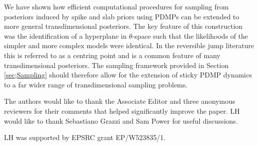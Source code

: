 \documentclass[ba,preprint]{imsart}
\theoremstyle{plain}
\theoremstyle{definition}
\theoremstyle{remark}
\begin{document}
We have shown how efficient computational procedures for sampling from posteriors induced by spike and slab priors using PDMPs can be extended to more general transdimensional posteriors. The key feature of this construction was the identification of a hyperplane in $\theta$-space such that the likelihoods of the simpler and more complex models were identical. In the reversible jump literature this is referred to as a centring point \citep{Brooks2003} and is a common feature of many transdimensional posteriors. The sampling framework provided in Section \ref{sec;Sampling} should therefore allow for the extension of sticky PDMP dynamics to a far wider range of transdimensional sampling problems.

\begin{acks}[Acknowledgments]
    The authors would like to thank the Associate Editor and three anonymous reviewers for their comments that helped significantly improve the paper. LH would like to thank Sebastiano Grazzi and Sam Power for useful discussions.
\end{acks}

\begin{funding}
LH was supported by EPSRC grant EP/W523835/1.
\end{funding}

\begin{supplement}
\end{supplement}




\end{document}

